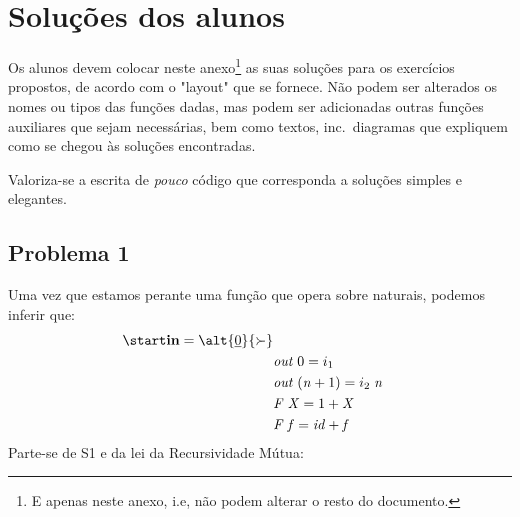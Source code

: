 \documentclass[a4paper]{article}
\newcommand{\Conid}[1]{\mathit{#1}}
\newcommand{\Varid}[1]{\mathit{#1}}
\begin{document}
\section{Soluções dos alunos}\label{sec:resolucao}

Os alunos devem colocar neste anexo\footnote{E apenas neste anexo,
i.e, não podem alterar o resto do documento.} as suas soluções para os
exercícios propostos, de acordo com o "layout" que se fornece. Não podem
ser alterados os nomes ou tipos das funções dadas, mas podem ser adicionadas
outras funções auxiliares que sejam necessárias, bem como 
textos, inc.\ diagramas que expliquem como se chegou às soluções encontradas.

Valoriza-se a escrita de \emph{pouco} código que corresponda a soluções
simples e elegantes.

\subsection*{Problema 1} \label{pg:P1}

Uma vez que estamos perante uma função que opera sobre naturais, podemos inferir que:
\begin{eqnarray*}
\start

    \ensuremath{\mathbf{in}\mathrel{=}\alt{\underline{\mathrm{0}}}{\succ }} \\
&
    \ensuremath{\Varid{out}\;\mathrm{0}\mathrel{=}i_1} \\
&    
    \ensuremath{\Varid{out}\;(\Varid{n}\mathbin{+}\mathrm{1})\mathrel{=}i_2\;\Varid{n}} \\
&    
    \ensuremath{\Conid{F}\;\Conid{X}\mathrel{=}\mathrm{1}\mathbin{+}\Conid{X}} \\
&    
    \ensuremath{\Conid{F}\;\Varid{f}\mathrel{=}\Varid{id}\mathbin{+}\Varid{f}} 

\end{eqnarray*}
Parte-se de S1 e da lei da Recursividade Mútua: 
\end{document}
